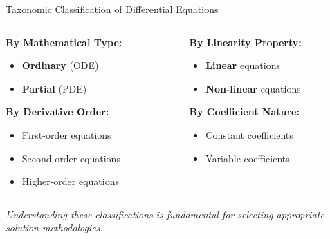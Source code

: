 \documentclass[10pt,aspectratio=169]{beamer}
\newcommand{\highlight}[1]{\textcolor{mLightBrown}{\textbf{#1}}}
\newcommand{\concept}[1]{\textcolor{mDarkTeal}{\textbf{#1}}}
\newcommand{\emphasis}[1]{\textit{#1}}
\begin{document}
\begin{frame}{Taxonomic Classification of Differential Equations}
    \begin{columns}
        \begin{column}{0.5\textwidth}
            \concept{By Mathematical Type:}
            \begin{itemize}
                \item \highlight{Ordinary} (ODE)
                \item \highlight{Partial} (PDE)
            \end{itemize}
            
            \vspace{0.3cm}
            
            \concept{By Derivative Order:}
            \begin{itemize}
                \item First-order equations
                \item Second-order equations
                \item Higher-order equations
            \end{itemize}
        \end{column}
        \begin{column}{0.5\textwidth}
            \concept{By Linearity Property:}
            \begin{itemize}
                \item \highlight{Linear} equations
                \item \highlight{Non-linear} equations
            \end{itemize}
            
            \vspace{0.3cm}
            
            \concept{By Coefficient Nature:}
            \begin{itemize}
                \item Constant coefficients
                \item Variable coefficients
            \end{itemize}
        \end{column}
    \end{columns}
    
    \vspace{0.3cm}
    
    \emphasis{Understanding these classifications is fundamental for selecting appropriate solution methodologies.}
\end{frame}
\end{document}
